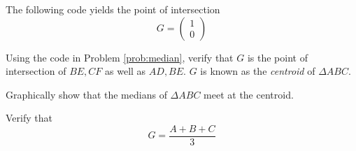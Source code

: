 \documentclass[journal,12pt,twocolumn]{IEEEtran}
\begin{document}
The following code yields the point of intersection 
\begin{equation}
G =
\begin{pmatrix}
1
\\
0
\end{pmatrix}
\end{equation}

\begin{problem}
Using the code in Problem \ref{prob:median}, verify that $G$ is the point of intersection of $BE,CF$ as well as
$AD,BE$.  $G$ is known as the {\em centroid} of $\Delta ABC$.
\end{problem}
\begin{problem}
Graphically show that the medians of $\Delta ABC$ meet at the centroid.
\end{problem}
\begin{problem}
Verify that
\begin{equation}
G = \frac{A+B+C}{3}
\end{equation}
\end{problem}
%
%
\end{document}
